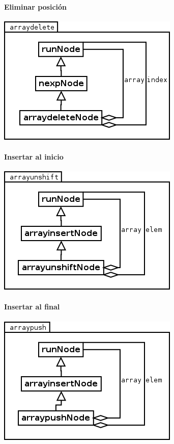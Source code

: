 \paragraph {Eliminar posición}
\begin{center}
\includegraphics[scale=0.4]{delete.png} \\
\end{center}

\paragraph {Insertar al inicio}
\begin{center}
\includegraphics[scale=0.4]{unshift.png} \\
\end{center}

\paragraph {Insertar al final}
\begin{center}
\includegraphics[scale=0.4]{push.png} \\
\end{center}

